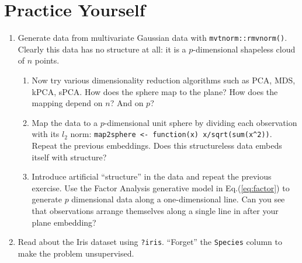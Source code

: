 \documentclass[]{book}
\providecommand{\tightlist}{%
  \setlength{\itemsep}{0pt}\setlength{\parskip}{0pt}}
\theoremstyle{definition}
\theoremstyle{definition}
\theoremstyle{definition}
\theoremstyle{remark}
\begin{document}
\section{Practice Yourself}\label{practice-yourself-7}

\begin{enumerate}
\def\labelenumi{\arabic{enumi}.}
\tightlist
\item
  Generate data from multivariate Gaussian data with
  \texttt{mvtnorm::rmvnorm()}. Clearly this data has no structure at
  all: it is a \(p\)-dimensional shapeless cloud of \(n\) points.

  \begin{enumerate}
  \def\labelenumii{\arabic{enumii}.}
  \tightlist
  \item
    Now try various dimensionality reduction algorithms such as PCA,
    MDS, kPCA, sPCA. How does the sphere map to the plane? How does the
    mapping depend on \(n\)? And on \(p\)?
  \item
    Map the data to a \(p\)-dimensional unit sphere by dividing each
    observation with its \(l_2\) norm:
    \texttt{map2sphere\ \textless{}-\ function(x)\ x/sqrt(sum(x\^{}2))}.
    Repeat the previous embeddings. Does this structureless data embeds
    itself with structure?
  \item
    Introduce artificial ``structure'' in the data and repeat the
    previous exercise. Use the Factor Analysis generative model in
    Eq.(\eqref{eq:factor}) to generate \(p\) dimensional data along a
    one-dimensional line. Can you see that observations arrange
    themselves along a single line in after your plane embedding?
  \end{enumerate}
\item
  Read about the Iris dataset using \texttt{?iris}. ``Forget'' the
  \texttt{Species} column to make the problem unsupervised.


\end{enumerate}
\end{document}
